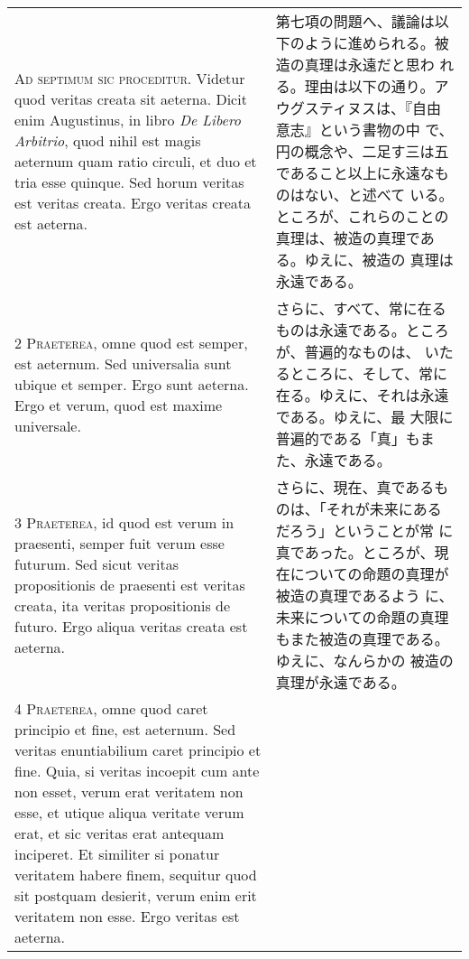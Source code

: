 \documentclass[10pt]{jsarticle} %
\begin{document}
\begin{longtable}{p{21em}p{21em}}

{\huge A}{\scshape d septimum sic proceditur}. Videtur quod veritas
creata sit aeterna. Dicit enim Augustinus, in libro {\itshape De
Libero Arbitrio}, quod nihil est magis aeternum quam ratio circuli, et
duo et tria esse quinque. Sed horum veritas est veritas creata. Ergo
veritas creata est aeterna.


&

第七項の問題へ、議論は以下のように進められる。被造の真理は永遠だと思わ
れる。理由は以下の通り。アウグスティヌスは、『自由意志』という書物の中
で、円の概念や、二足す三は五であること以上に永遠なものはない、と述べて
いる。ところが、これらのことの真理は、被造の真理である。ゆえに、被造の
真理は永遠である。

\\



{\scshape 2 Praeterea}, omne quod est semper, est aeternum. Sed
 universalia sunt ubique et semper. Ergo sunt aeterna. Ergo et verum,
 quod est maxime universale.


&

 さらに、すべて、常に在るものは永遠である。ところが、普遍的なものは、
いたるところに、そして、常に在る。ゆえに、それは永遠である。ゆえに、最
大限に普遍的である「真」もまた、永遠である。


\\

{\scshape 3 Praeterea}, id quod est verum in praesenti, semper fuit
verum esse futurum. Sed sicut veritas propositionis de praesenti est
veritas creata, ita veritas propositionis de futuro. Ergo aliqua
veritas creata est aeterna.


&

さらに、現在、真であるものは、「それが未来にあるだろう」ということが常
に真であった。ところが、現在についての命題の真理が被造の真理であるよう
に、未来についての命題の真理もまた被造の真理である。ゆえに、なんらかの
被造の真理が永遠である。

\\

{\scshape 4 Praeterea}, omne quod caret principio et fine, est
aeternum. Sed veritas enuntiabilium caret principio et fine. Quia, si
veritas incoepit cum ante non esset, verum erat veritatem non esse, et
utique aliqua veritate verum erat, et sic veritas erat antequam
inciperet. Et similiter si ponatur veritatem habere finem, sequitur
quod sit postquam desierit, verum enim erit veritatem non esse. Ergo
veritas est aeterna.



\end{longtable}
\end{document}
